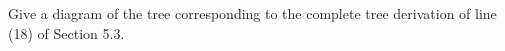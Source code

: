 \begin{problem}{5.1}
    Give a diagram of the tree corresponding to the complete tree derivation of line (18) of Section 5.3.
\end{problem}